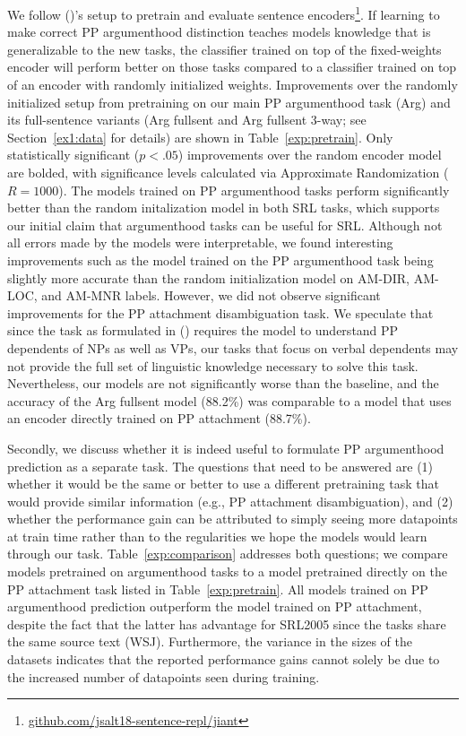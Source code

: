 \documentclass[letterpaper]{article} %
\begin{document}
We follow \citeauthor{bowman2018looking} (\citeyear{bowman2018looking})'s setup to pretrain and evaluate sentence encoders\footnote{\url{github.com/jsalt18-sentence-repl/jiant}}. If learning to make correct PP argumenthood distinction teaches models knowledge that is generalizable to the new tasks, the classifier trained on top of the fixed-weights encoder will perform better on those tasks compared to a classifier trained on top of an encoder with randomly initialized weights. Improvements over the randomly initialized setup from pretraining on our main PP argumenthood task (Arg) and its full-sentence variants (Arg fullsent and Arg fullsent 3-way; see Section~\ref{ex1:data} for details) are shown in Table~\ref{exp:pretrain}. Only statistically significant ($p<.05$) improvements over the random encoder model are bolded, with significance levels calculated via Approximate Randomization \cite{yeh2000more} ($R=1000$). The models trained on PP argumenthood tasks perform significantly better than the random initalization model in both SRL tasks, which supports our initial claim that argumenthood tasks can be useful for SRL. Although not all errors made by the models were interpretable, we found interesting improvements such as the model trained on the PP argumenthood task being slightly more accurate than the random initialization model on \textsc{AM-DIR, AM-LOC}, and \textsc{AM-MNR} labels.  However, we did not observe significant improvements for the PP attachment disambiguation task. We speculate that since the task as formulated in \citeauthor{belinkov2014exploring} (\citeyear{belinkov2014exploring}) requires the model to understand PP dependents of NPs as well as VPs, our tasks that focus on verbal dependents may not provide the full set of linguistic knowledge necessary to solve this task. Nevertheless, our models are not significantly worse than the baseline, and the accuracy of the Arg fullsent model (88.2\%) was comparable to a model that uses an encoder directly trained on PP attachment (88.7\%).

Secondly, we discuss whether it is indeed useful to formulate PP argumenthood prediction as a separate task. The questions that need to be answered are (1) whether it would be the same or better to use a different pretraining task that would provide similar information (e.g., PP attachment disambiguation), and (2) whether the performance gain can be attributed to simply seeing more datapoints at train time rather than to the regularities we hope the models would learn through our task. Table~\ref{exp:comparison} addresses both questions; we compare models pretrained on argumenthood tasks to a model pretrained directly on the PP attachment task listed in Table~\ref{exp:pretrain}. All models trained on PP argumenthood prediction outperform the model trained on PP attachment, despite the fact that the latter has advantage for SRL2005 since the tasks share the same source text (WSJ). Furthermore, the variance in the sizes of the datasets indicates that the reported performance gains cannot solely be due to the increased number of datapoints seen during training.
\end{document}
